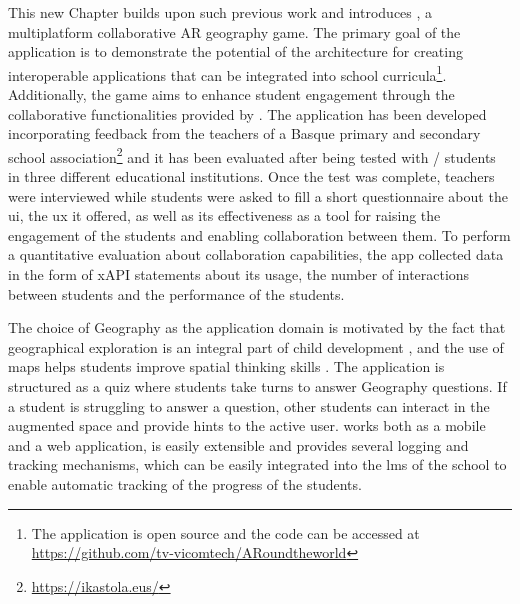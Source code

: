 
This new Chapter builds upon such previous work and introduces \appname{}, a multiplatform collaborative AR geography game.
The primary goal of the application is to demonstrate the potential of the \arch{} architecture for creating interoperable applications that can be integrated into school curricula\footnote{The application is open source and the code can be accessed at \url{https://github.com/tv-vicomtech/ARoundtheworld}}.
Additionally, the game aims to enhance student engagement through the collaborative functionalities provided by \arch{}.
The application has been developed incorporating feedback from the teachers of a Basque primary and secondary school association\footnote{\url{https://ikastola.eus/}} and it has been evaluated after being tested with \numstudents/ students in three different educational institutions.
Once the test was complete, teachers were interviewed while students were asked to fill a short questionnaire about the \appname{} \gls{ui}, the \gls{ux} it offered, as well as its effectiveness as a tool for raising the engagement of the students and enabling collaboration between them.
To perform a quantitative evaluation about \appname{} collaboration capabilities, the app collected data \textendash{} in the form of xAPI statements \citep{xAPIspec} \textendash{} about its usage, the number of interactions between students and the performance of the students.

The choice of Geography as the application domain is motivated by the fact that geographical exploration is an integral part of child development \citep{catling1993whole}, and the use of maps helps students improve spatial thinking skills \citep{collins2018impact}.
The application is structured as a quiz where students take turns to answer Geography questions.
If a student is struggling to answer a question, other students can interact in the augmented space and provide hints to the active user.
\appname{} works both as a mobile and a web application, is easily extensible and provides several logging and tracking mechanisms, which can be easily integrated into the \gls{lms} of the school to enable automatic tracking of the progress of the students.

